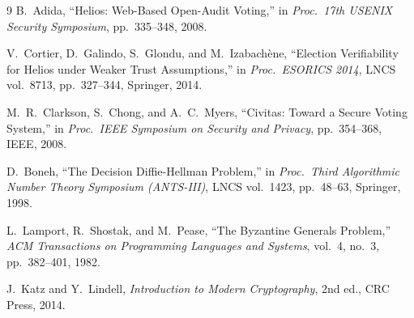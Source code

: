 \documentclass[12pt,a4paper]{article}
\theoremstyle{definition}
\theoremstyle{remark}
\begin{document}
\begin{thebibliography}{9}
B.\ Adida,
``Helios: Web-Based Open-Audit Voting,''
in \textit{Proc.\ 17th USENIX Security Symposium},
pp.~335--348, 2008.

V.\ Cortier, D.\ Galindo, S.\ Glondu, and M.\ Izabach{\`e}ne,
``Election Verifiability for Helios under Weaker Trust Assumptions,''
in \textit{Proc.\ ESORICS 2014},
LNCS vol.~8713, pp.~327--344, Springer, 2014.

M.\ R.\ Clarkson, S.\ Chong, and A.\ C.\ Myers,
``Civitas: Toward a Secure Voting System,''
in \textit{Proc.\ IEEE Symposium on Security and Privacy},
pp.~354--368, IEEE, 2008.

D.\ Boneh,
``The Decision Diffie-Hellman Problem,''
in \textit{Proc.\ Third Algorithmic Number Theory Symposium (ANTS-III)},
LNCS vol.~1423, pp.~48--63, Springer, 1998.

L.\ Lamport, R.\ Shostak, and M.\ Pease,
``The Byzantine Generals Problem,''
\textit{ACM Transactions on Programming Languages and Systems},
vol.~4, no.~3, pp.~382--401, 1982.

J.\ Katz and Y.\ Lindell,
\textit{Introduction to Modern Cryptography}, 2nd ed.,
CRC Press, 2014.

\end{thebibliography}
\end{document}
